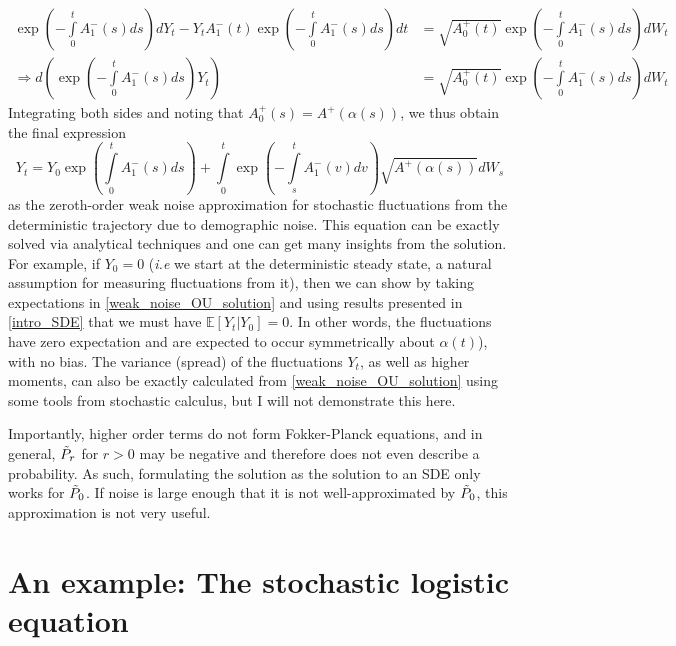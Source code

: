 \begin{align*}
	\exp\left(-{\int\limits_{0}^{t}A^-_1(s)ds}\right)dY_t - Y_tA^-_1(t)\exp\left(-{\int\limits_{0}^{t}A^-_1(s)ds}\right)dt &= \sqrt{A^+_0(t)}\exp\left(-{\int\limits_{0}^{t}A^-_1(s)ds}\right)dW_t\\
	\Rightarrow d\left(\exp\left(-{\int\limits_{0}^{t}A^-_1(s)ds}\right)Y_t\right) &= \sqrt{A^+_0(t)}\exp\left(-{\int\limits_{0}^{t}A^-_1(s)ds}\right)dW_t
\end{align*}
Integrating both sides and noting that $A^+_0(s) = A^+(\alpha(s))$, we thus obtain the final expression
\begin{equation}
	\label{weak_noise_OU_solution}
	Y_t = Y_0\exp\left({\int\limits_{0}^{t}A^-_1(s)ds}\right)+\int\limits_{0}^{t}\exp\left(-\int\limits_{s}^{t}A^-_{1}(v)dv\right)\sqrt{A^+(\alpha(s))}dW_s
\end{equation}
as the zeroth-order weak noise approximation for stochastic fluctuations from the deterministic trajectory due to demographic noise. This equation can be exactly solved via analytical techniques and one can get many insights from the solution. For example, if $Y_0 = 0$ (\emph{i.e} we start at the deterministic steady state, a natural assumption for measuring fluctuations from it), then we can show by taking expectations in \eqref{weak_noise_OU_solution} and using results presented in \ref{intro_SDE} that we must have $\mathbb{E}[Y_t | Y_0] = 0$. In other words, the fluctuations have zero expectation and are expected to occur symmetrically about $\alpha(t)$), with no bias. The variance (spread) of the fluctuations $Y_t$, as well as higher moments, can also be exactly calculated from \eqref{weak_noise_OU_solution} using some tools from stochastic calculus, but I will not demonstrate this here.

Importantly, higher order terms do not form Fokker-Planck equations, and in general, $\Tilde{P}_r$ for $r>0$ may be negative and therefore does not even describe a probability. As such, formulating the solution as the solution to an SDE only works for $\Tilde{P}_0$. If noise is large enough that it is not well-approximated by $\Tilde{P}_0$, this approximation is not very useful.

\section{An example: The stochastic logistic equation}

